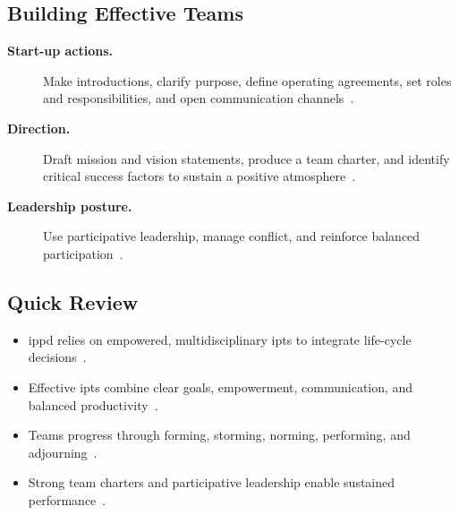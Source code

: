 \documentclass[../main.tex]{subfiles}
\begin{document}
\subsection{Building Effective Teams}
\begin{description}
  \item[\textbf{Start-up actions.}] Make introductions, clarify purpose, define operating agreements, set roles and responsibilities, and open communication channels~\autocite{edo-5-1-5-team-building-2025}.
  \item[\textbf{Direction.}] Draft mission and vision statements, produce a team charter, and identify critical success factors to sustain a positive atmosphere~\autocite{edo-5-1-5-team-building-2025}.
  \item[\textbf{Leadership posture.}] Use participative leadership, manage conflict, and reinforce balanced participation~\autocite{edo-5-1-5-team-building-2025}.
\end{description}

\subsection{Quick Review}
\begin{itemize}
  \item \ac{ippd} relies on empowered, multidisciplinary \acp{ipt} to integrate life-cycle decisions~\autocite{edo-5-1-5-team-building-2025}.
  \item Effective \acp{ipt} combine clear goals, empowerment, communication, and balanced productivity~\autocite{edo-5-1-5-team-building-2025}.
  \item Teams progress through forming, storming, norming, performing, and adjourning~\autocite{edo-5-1-5-team-building-2025}.
  \item Strong team charters and participative leadership enable sustained performance~\autocite{edo-5-1-5-team-building-2025}.
\end{itemize}

\end{document}
